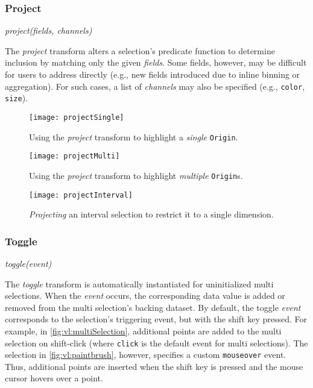 
\subsubsection{Project}

\centerline{\emph{project(fields, channels)}}

The \emph{project} transform alters a selection's predicate function to
determine inclusion by matching only the given \emph{fields}. Some fields,
however, may be difficult for users to address directly (e.g., new fields
introduced due to inline binning or aggregation). For such cases, a list of
\emph{channels} may also be specified (e.g., \texttt{color}, \texttt{size}).

\begin{figure}[h!]
  \centering
  \texttt{[image: projectSingle]}
  \caption{Using the \emph{project} transform to highlight a \emph{single}
  \texttt{Origin}.}
  \label{fig:vl:projectSingle}
\end{figure}

\begin{figure}[h!]
  \centering
  \texttt{[image: projectMulti]}
  \caption{Using the \emph{project} transform to highlight \emph{multiple}
  \texttt{Origin}s.}
  \label{fig:vl:projectMulti}
\end{figure}

\begin{figure}[h!]
  \centering
  \texttt{[image: projectInterval]}
  \caption{\emph{Projecting} an interval selection to restrict it to a
  single dimension.}
  \label{fig:vl:projectInterval}
\end{figure}

\subsubsection{Toggle}

\centerline{\emph{toggle(event)}}

The \emph{toggle} transform is automatically instantiated for uninitialized
multi selections. When the \emph{event} occurs, the corresponding data value is
added or removed from the multi selection's backing dataset. By default, the
toggle \emph{event} corresponds to the selection's triggering event, but with
the shift key pressed. For example, in \cref{fig:vl:multiSelection}, additional
points are added to the multi selection on shift-click (where \texttt{click} is
the default event for multi selections). The selection in \cref{fig:vl:paintbrush},
however, specifies a custom \texttt{mouseover} event. Thus, additional points
are inserted when the shift key is pressed and the mouse cursor hovers over a
point.

